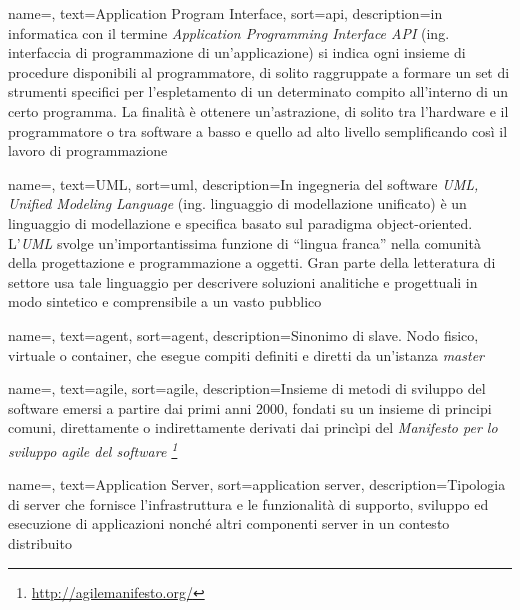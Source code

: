 

{
    name=,
    text=Application Program Interface,
    sort=api,
    description={in informatica con il termine \emph{Application Programming Interface API} (ing. interfaccia di programmazione di un'applicazione) si indica ogni insieme di procedure disponibili al programmatore, di solito raggruppate a formare un set di strumenti specifici per l'espletamento di un determinato compito all'interno di un certo programma. La finalità è ottenere un'astrazione, di solito tra l'hardware e il programmatore o tra software a basso e quello ad alto livello semplificando così il lavoro di programmazione}
}

{
    name=,
    text=UML,
    sort=uml,
    description={In ingegneria del software \emph{UML, Unified Modeling Language} (ing. linguaggio di modellazione unificato) è un linguaggio di modellazione e specifica basato sul paradigma object-oriented. L'\emph{UML} svolge un'importantissima funzione di ``lingua franca'' nella comunità della progettazione e programmazione a oggetti. Gran parte della letteratura di settore usa tale linguaggio per descrivere soluzioni analitiche e progettuali in modo sintetico e comprensibile a un vasto pubblico}
}

{
    name=,
    text=agent,
    sort=agent,
    description={Sinonimo di slave. Nodo fisico, virtuale o container, che esegue compiti definiti e diretti da un'istanza \textit{master}}
}

{
    name=,
    text=agile,
    sort=agile,
    description={Insieme di metodi di sviluppo del software emersi a partire dai primi anni 2000, fondati su un insieme di principi comuni, direttamente o indirettamente derivati dai princìpi del \textit{Manifesto per lo sviluppo agile del software  \footnote{\url{http://agilemanifesto.org/}}}}
}

{
    name=,
    text=Application Server,
    sort=application server,
    description={Tipologia di server che fornisce l'infrastruttura e le funzionalità di supporto, sviluppo ed esecuzione di applicazioni nonché altri componenti server in un contesto distribuito}
}

